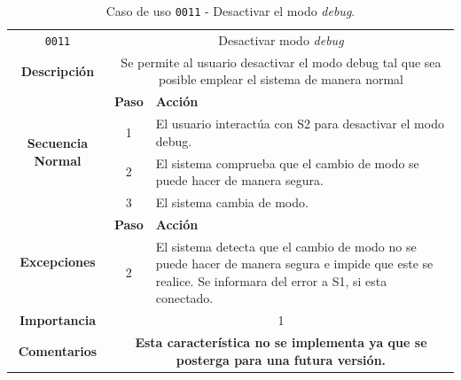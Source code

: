 \begin{table}[H]
    \centering
    \begin{tabularx}{\textwidth}{|c|c|X|}
        \cline{1-3}
        \texttt{0011}        & \multicolumn{2}{c|}{Desactivar modo \textit{debug}}                                      
        \\ \cline{1-3}
        \textbf{Descripción} & \multicolumn{2}{m{13cm}|}{Se permite al usuario desactivar el modo debug tal que sea posible emplear el sistema de manera normal}
        \\ \cline{1-3}
        \multirow{4}{*}{\textbf{Secuencia Normal}} & \textbf{Paso} & \textbf{Acción}
        \\ \cline{2-3}                    &   1  & El usuario interactúa con \ac{S2} para desactivar el modo debug.
        \\ \cline{2-3}                    &   2  & El sistema comprueba que el cambio de modo se puede hacer de manera segura.
        \\ \cline{2-3}                    &   3  & El sistema cambia de modo.
        \\ \cline{1-3}
        \multirow{2}{*}{\textbf{Excepciones}} & \textbf{Paso} & \textbf{Acción}
        \\ \cline{2-3}                    &   2  & El sistema detecta que el cambio de modo no se puede hacer de manera segura e impide que este se realice. Se informara del error a \ac{S1}, si esta conectado.
        \\ \cline{1-3}
        \textbf{Importancia}                 & \multicolumn{2}{c|}{1}           
        \\ \cline{1-3}
        \textbf{Comentarios}                 & \multicolumn{2}{m{13cm}|}{\textbf{Esta característica no se implementa ya que se posterga para una futura versión.}}
        \\ \cline{1-3}
    \end{tabularx}
    \caption{Caso de uso \texttt{0011} - Desactivar el modo \textit{debug}.}
    \label{tab:CU0011}
    \label{tab:caso_de_uso_desactivar_modo_debug}
\end{table}